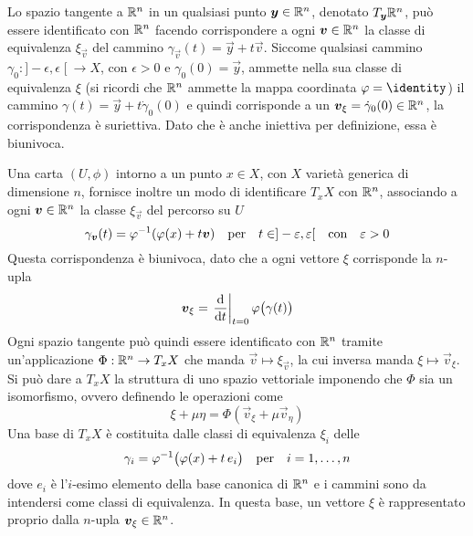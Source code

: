 Lo spazio tangente a $\mathbb{R}^{n}$ in un qualsiasi punto $\boldsymbol{y} \in \mathbb{R}^{n}$, denotato $T_{\boldsymbol{y}} \mathbb{R}^{n}$, può essere identificato con $\mathbb{R}^{n}$ facendo corrispondere a ogni $\boldsymbol{v} \in \mathbb{R}^{n}$ la classe di equivalenza $\xi_{\vec{v}}$ del cammino $\gamma_{\vec{v}}(t) = \vec{y} + t\vec{v}$. Siccome qualsiasi cammino $\gamma_0:]-\epsilon,\epsilon\;[\ \to X$, con $\epsilon > 0$ e $\gamma_0(0)=\vec{y}$, ammette nella sua classe di equivalenza $\xi$ (si ricordi che $\mathbb{R}^{n}$ ammette la mappa coordinata $\phi = \identity$) il cammino $\gamma(t) = \vec{y} + t\dot{\gamma}_0(0)$ e quindi corrisponde a un $\boldsymbol{v}_{\xi} = \dot{\gamma}_0(0) \in \mathbb{R}^{n}$, la corrispondenza è suriettiva. Dato che è anche iniettiva per definizione, essa è biunivoca. 

Una carta $(U, \phi)$ intorno a un punto $x \in  X$, con $X$ varietà generica di dimensione $n$, fornisce inoltre un modo di identificare $T_x X$ con $\mathbb{R}^{n}$, associando a ogni $\boldsymbol{v} \in \mathbb{R}^{n}$ la classe $\xi_{\vec{v}}$ del percorso su $U$ \begin{equation} \label{eq:tangentRn}
  \gamma_{\vec{v}}(t) = \phi^{-1}(\phi(x)+t\vec{v}) \qqtext{per} t \in ]-\epsilon, \epsilon[ \qqtext{con} \epsilon > 0
\end{equation} Questa corrispondenza è biunivoca, dato che a ogni vettore $\xi$ corrisponde la $n$-upla \begin{equation*} \label{eq:tangentCoords}
\vec{v}_{\xi} = \eval{\dv{t}}_{t=0} \phi\big( \gamma(t)\big)
\end{equation*} Ogni spazio tangente può quindi essere identificato con $\mathbb{R}^{n}$ tramite un'applicazione $\Phi: \mathbb{R}^{n} \to T_x X$ che manda $\vec{v} \mapsto \xi_{\vec{v}}$, la cui inversa manda $\xi \mapsto \vec{v}_{\xi}$. Si può dare a $T_x X$ la struttura di uno spazio vettoriale imponendo che $\Phi$ sia un isomorfismo, ovvero definendo le operazioni come
\begin{equation*}
\xi + \mu \eta = \Phi(\vec{v}_\xi + \mu \vec{v}_{\eta})
\end{equation*}
Una base di $T_x X$ è costituita dalle classi di equivalenza $\xi_i$ delle  \begin{equation} \label{eq:tangentRnBase}
  \gamma_i = \phi^{-1}\big(\phi(x)+t\, e_i\big) \qqtext{per} i=1, \ldots, n
\end{equation}
dove $e_i$ è l'$i$-esimo elemento della base canonica di $\mathbb{R}^{n}$ e i cammini sono da intendersi come classi di equivalenza. In questa base, un vettore $\xi$ è rappresentato proprio dalla $n$-upla $\boldsymbol{v}_{\xi} \in \mathbb{R}^{n}$.

